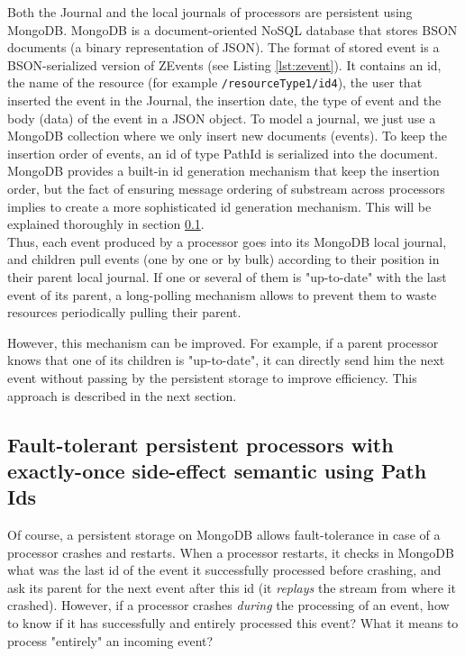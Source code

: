Both the Journal and the local journals of processors are persistent using MongoDB. MongoDB is a document-oriented NoSQL database  that stores BSON documents (a binary representation of JSON). The format of stored event is a BSON-serialized version of ZEvents (see Listing \ref{lst:zevent}). It contains an id, the name of the resource (for example \verb|/resourceType1/id4|), the user that inserted the event in the Journal, the insertion date, the type of event and the body (data) of the event in a JSON object. To model a journal, we just use a MongoDB collection where we only insert new documents (events). To keep the insertion order of events, an id of type PathId is serialized
into the document. MongoDB provides a built-in id generation mechanism that keep the insertion order, but the fact of ensuring message ordering of substream across processors implies to create a more sophisticated id generation mechanism. This will be explained thoroughly in section \ref{sec:substreamproblem}.
\\

Thus, each event produced by a processor goes into its MongoDB local journal, and children pull events (one by one or by bulk) according to their position in their parent
local journal. If one or several of them is "up-to-date" with the last event of its parent, a long-polling mechanism allows to prevent them to waste resources periodically pulling their parent.

However, this mechanism can be improved. For example, if a parent processor knows that one of its children is "up-to-date", it can directly send him the next event without
passing by the persistent storage to improve efficiency. This approach is described in the next section.

\subsection{Fault-tolerant persistent processors with exactly-once side-effect semantic using Path Ids}
\label{sec:substreamproblem}

Of course, a persistent storage on MongoDB allows fault-tolerance in case of a processor crashes and restarts. When a processor restarts, it checks in MongoDB what was the
last id of the event it successfully processed before crashing, and ask its parent for the next event after this id (it \textit{replays} the stream from where it crashed).
However, if a processor crashes \textit{during} the processing of an event, how to know if it has successfully and entirely processed this event? What it means to process "entirely" an incoming event?
\\

